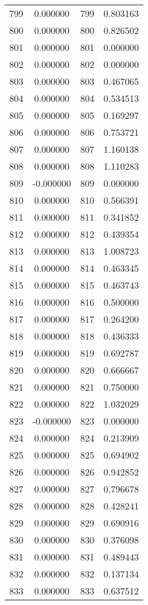 \documentclass[12pt]{article}
\begin{document}
\begin{longtable}{@{}cccc@{}}
799 & 0.000000 & 799 & 0.803163 \\
800 & 0.000000 & 800 & 0.826502 \\
801 & 0.000000 & 801 & 0.000000 \\
802 & 0.000000 & 802 & 0.000000 \\
803 & 0.000000 & 803 & 0.467065 \\
804 & 0.000000 & 804 & 0.534513 \\
805 & 0.000000 & 805 & 0.169297 \\
806 & 0.000000 & 806 & 0.753721 \\
807 & 0.000000 & 807 & 1.160138 \\
808 & 0.000000 & 808 & 1.110283 \\
809 & -0.000000 & 809 & 0.000000 \\
810 & 0.000000 & 810 & 0.566391 \\
811 & 0.000000 & 811 & 0.341852 \\
812 & 0.000000 & 812 & 0.439354 \\
813 & 0.000000 & 813 & 1.008723 \\
814 & 0.000000 & 814 & 0.463345 \\
815 & 0.000000 & 815 & 0.463743 \\
816 & 0.000000 & 816 & 0.500000 \\
817 & 0.000000 & 817 & 0.264200 \\
818 & 0.000000 & 818 & 0.436333 \\
819 & 0.000000 & 819 & 0.692787 \\
820 & 0.000000 & 820 & 0.666667 \\
821 & 0.000000 & 821 & 0.750000 \\
822 & 0.000000 & 822 & 1.032029 \\
823 & -0.000000 & 823 & 0.000000 \\
824 & 0.000000 & 824 & 0.213909 \\
825 & 0.000000 & 825 & 0.694902 \\
826 & 0.000000 & 826 & 0.942852 \\
827 & 0.000000 & 827 & 0.796678 \\
828 & 0.000000 & 828 & 0.428241 \\
829 & 0.000000 & 829 & 0.690916 \\
830 & 0.000000 & 830 & 0.376098 \\
831 & 0.000000 & 831 & 0.489443 \\
832 & 0.000000 & 832 & 0.137134 \\
833 & 0.000000 & 833 & 0.637512 \\

\end{longtable}
\end{document}
